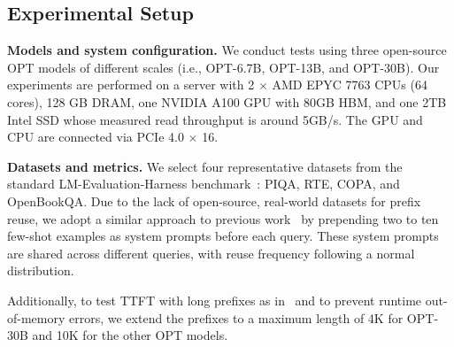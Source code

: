 \subsection{Experimental Setup}
\label{exp:setup}

\textbf{Models and system configuration.}
We conduct tests using three open-source OPT models of different scales (i.e., OPT-6.7B, OPT-13B, and OPT-30B). Our experiments are performed on a server with 2 $\times$ AMD EPYC 7763 CPUs (64 cores), 128 GB DRAM, one NVIDIA A100 GPU with 80GB HBM, and one 2TB Intel SSD whose measured read throughput is around 5GB/s. The GPU and CPU are connected via PCIe 4.0 $\times$ 16.

\noindent \textbf{Datasets and metrics.}
We select four representative datasets from the standard LM-Evaluation-Harness benchmark~\cite{lmeval}: PIQA, RTE, COPA, and OpenBookQA. 
Due to the lack of open-source, real-world datasets for prefix reuse, we adopt a similar approach to previous work~\cite{infinigen-osdi24} by prepending two to ten few-shot examples as system prompts before each query. These system prompts are shared across different queries, with reuse frequency following a normal distribution.

Additionally, to test TTFT with long prefixes as in~\cite{cachegen-sigcomm24} and to prevent runtime out-of-memory errors, we extend the prefixes to a maximum length of 4K for OPT-30B and 10K for the other OPT models.

